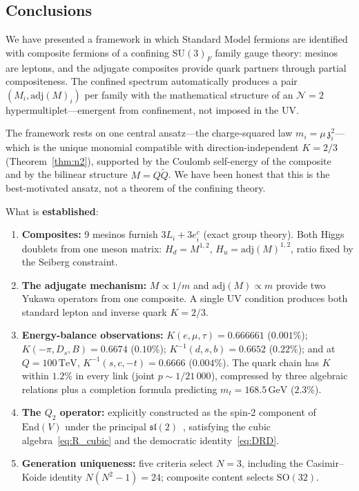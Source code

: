 \documentclass[12pt,a4paper]{article}
\newcommand{\SU}{\mathrm{SU}}
\newcommand{\SO}{\mathrm{SO}}
\newcommand{\adj}{\mathrm{adj}}
\newcommand{\GeV}{\,\mathrm{GeV}}
\newcommand{\TeV}{\,\mathrm{TeV}}
\newcommand{\zch}{\mathfrak{z}}
\begin{document}
\subsection{Conclusions}

We have presented a framework in which Standard Model fermions
are identified with composite fermions of a confining $\SU(3)_F$
family gauge theory: mesinos are leptons, and the adjugate
composites provide quark partners through partial compositeness.
The confined spectrum automatically produces a pair
$(M_i, \adj(M)_i)$ per family with the mathematical structure of
an $\mathcal{N}{=}2$ hypermultiplet---emergent from confinement,
not imposed in the UV.

The framework rests on one central ansatz---the charge-squared
law $m_i = \mu\,\zch_i^2$---which is the unique monomial
compatible with direction-independent $K = 2/3$
(Theorem~\ref{thm:n2}), supported by the Coulomb self-energy
of the composite~\cite{Koide:1983qe} and by the bilinear
structure $M = Q\tilde{Q}$.
We have been honest that this is the best-motivated ansatz, not
a theorem of the confining theory.

What is \textbf{established}:
\begin{enumerate}
  \item \textbf{Composites:} 9 mesinos furnish $3L_i + 3e_i^c$
    (exact group theory).
    Both Higgs doublets from one meson matrix:
    $H_d = M^{1,2}$, $H_u = \adj(M)^{1,2}$, ratio fixed by the
    Seiberg constraint.

  \item \textbf{The adjugate mechanism:} $M \propto 1/m$ and
    $\adj(M) \propto m$ provide two Yukawa operators from one
    composite.
    A single UV condition produces both standard lepton and
    inverse quark $K = 2/3$.

  \item \textbf{Energy-balance observations:}
    $K(e,\mu,\tau) = 0.666661$ ($0.001\%$);
    $K(-\pi, D_s, B) = 0.6674$ ($0.10\%$);
    $K^{-1}(d,s,b) = 0.6652$ ($0.22\%$);
    and at $Q = 100\TeV$, $K^{-1}(s,c,-t) = 0.6666$ ($0.004\%$).
    The quark chain has $K$ within $1.2\%$ in every link
    (joint $p \sim 1/21\,000$), compressed by three algebraic
    relations plus a completion formula predicting
    $m_t = 168.5\GeV$ ($2.3\%$).

  \item \textbf{The $Q_2$ operator:} explicitly constructed
    as the spin-2 component of $\mathrm{End}(V)$ under the
    principal $\mathfrak{sl}(2)$~\cite{Kostant:1959}, satisfying
    the cubic algebra~\eqref{eq:R_cubic} and the democratic
    identity~\eqref{eq:DRD}.

  \item \textbf{Generation uniqueness:} five criteria select
    $N = 3$, including the Casimir--Koide identity
    $N(N^2-1) = 24$; composite content selects $\SO(32)$.
\end{enumerate}
\end{document}
